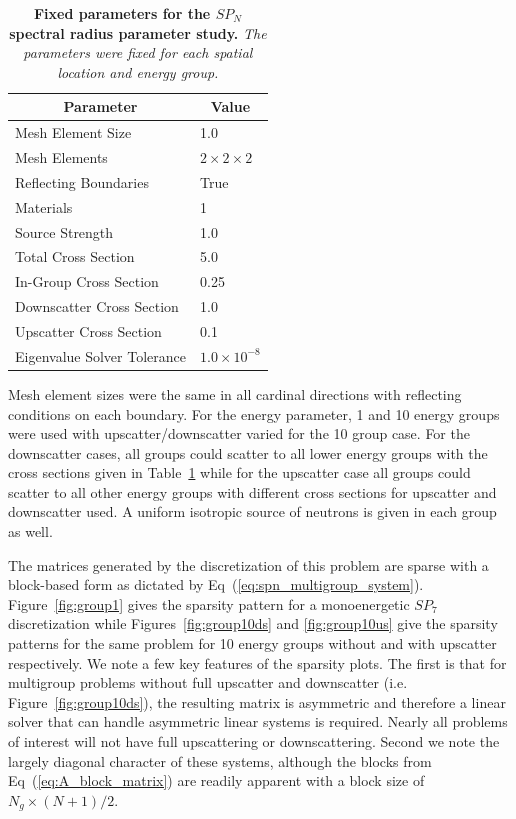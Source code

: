 \begin{table}[h!]
  \begin{center}
    \begin{tabular}{ll}\hline\hline
      \multicolumn{1}{c}{Parameter}& 
      \multicolumn{1}{c}{Value} \\\hline
      Mesh Element Size & 1.0 \\
      Mesh Elements & $2 \times 2 \times 2$ \\
      Reflecting Boundaries & True \\
      Materials & 1 \\
      Source Strength & 1.0 \\
      Total Cross Section & 5.0 \\
      In-Group Cross Section & 0.25 \\
      Downscatter Cross Section & 1.0 \\
      Upscatter Cross Section & 0.1 \\
      Eigenvalue Solver Tolerance & $1.0\times10^{-8}$ \\
      \hline\hline
    \end{tabular}
  \end{center}
  \caption{\textbf{Fixed parameters for the $SP_N$ spectral radius
      parameter study.} \textit{The parameters were fixed for each
      spatial location and energy group.}}
  \label{tab:spn_fixed_parameters}
\end{table}

Mesh element sizes were the same in all cardinal directions with
reflecting conditions on each boundary. For the energy parameter, 1
and 10 energy groups were used with upscatter/downscatter varied for
the 10 group case. For the downscatter cases, all groups could scatter
to all lower energy groups with the cross sections given in
Table~\ref{tab:spn_fixed_parameters} while for the upscatter case all
groups could scatter to all other energy groups with different cross
sections for upscatter and downscatter used. A uniform isotropic
source of neutrons is given in each group as well.

The matrices generated by the discretization of this problem are
sparse with a block-based form as dictated by
Eq~(\ref{eq:spn_multigroup_system}). Figure~\ref{fig:group1} gives the
sparsity pattern for a monoenergetic $SP_7$ discretization while
Figures~\ref{fig:group10ds} and \ref{fig:group10us} give the sparsity
patterns for the same problem for 10 energy groups without and with
upscatter respectively. We note a few key features of the sparsity
plots. The first is that for multigroup problems without full
upscatter and downscatter (i.e. Figure~\ref{fig:group10ds}), the
resulting matrix is asymmetric and therefore a linear solver that can
handle asymmetric linear systems is required. Nearly all problems of
interest will not have full upscattering or downscattering. Second we
note the largely diagonal character of these systems, although the
blocks from Eq~(\ref{eq:A_block_matrix}) are readily apparent with a
block size of $N_g\times(N+1)/2$.


